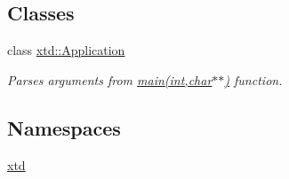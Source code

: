 \subsection*{Classes}
\begin{DoxyCompactItemize}
\item 
class \hyperlink{classxtd_1_1Application}{xtd\+::\+Application}
\begin{DoxyCompactList}\small\item\em Parses arguments from \hyperlink{doc_2example_2Application_8hh_a6b77b2233054447db17959182b5fb02b}{main(int,char$\ast$$\ast$)} function. \end{DoxyCompactList}\end{DoxyCompactItemize}
\subsection*{Namespaces}
\begin{DoxyCompactItemize}
\item 
 \hyperlink{namespacextd}{xtd}
\end{DoxyCompactItemize}
